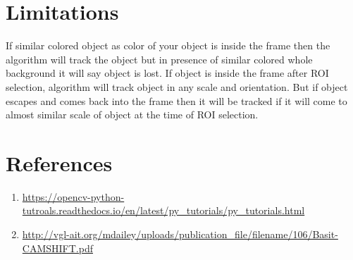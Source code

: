 \documentclass[11pt,a4paper]{article}
\begin{document}
	 \section{Limitations}
		 If similar colored object as color of your object is inside the frame then the algorithm will track the object but in presence of similar colored whole background it will say object is lost. If object is inside the frame after ROI selection, algorithm will track object in any scale and orientation. But if object escapes and comes back into the frame then it will be tracked if it will come to almost similar scale of object at the time of ROI selection.
	 \newpage
	\section{References}
	\begin{enumerate}
			\item \url{https://opencv-python-tutroals.readthedocs.io/en/latest/py_tutorials/py_tutorials.html}

\item \url{http://vgl-ait.org/mdailey/uploads/publication_file/filename/106/Basit-CAMSHIFT.pdf}
   \end{enumerate}
	
\end{document}
